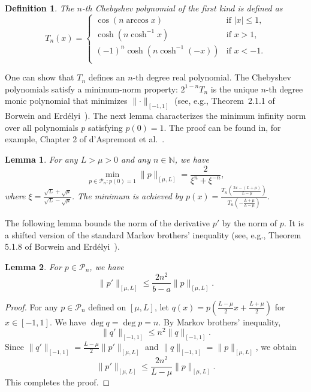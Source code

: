 \documentclass[11pt]{article}
\newcommand{\N}{\mathbb{N}}
\newcommand{\abs}[1]{\left\lvert#1\right\rvert}
\newcommand{\norm}[1]{\lVert#1\rVert}
\newtheorem{lemma}{Lemma}[section]
\newtheorem{definition}{Definition}[section]
\begin{document}
\begin{definition}\label{def:chebyshev_polynomial}
The $n$-th Chebyshev polynomial of the first kind is defined as
\[
	T_n(x) = \begin{cases}
		\cos(n\arccos x) &\text{if } \abs{x}\leq 1, \\
		\cosh(n\cosh^{-1}x) &\text{if }x>1, \\
		(-1)^n\cosh(n\cosh^{-1}(-x)) &\text{if }x<-1. \\
	\end{cases}
\]
\end{definition}
One can show that $T_n$ defines an $n$-th degree real polynomial.
The Chebyshev polynomials satisfy a minimum-norm property:
$2^{1-n}T_n$ is the unique $n$-th degree monic polynomial that minimizes $\norm{ \cdot }_{[-1,1]}$ (see, e.g., Theorem~2.1.1 of Borwein and Erd\'{e}lyi~\cite{borwein:1995}).
The next lemma characterizes the minimum infinity norm over all polynomials $p$ satisfying $p(0)=1$.
The proof can be found in, for example, Chapter 2 of d'Aspremont et al.~\cite{daspremont:2021}.

\begin{lemma}\label{lem:minimum_norm_polynomial}
For any $L>\mu>0$ and any $n\in\N$, we have
\[
	\min_{ p\in \mathscr{P}_n: p(0)=1 } \norm{p}_{ [\mu,L] }
    = \frac{2}{\xi^n + \xi^{-n}},
\]
where $\xi = \frac{\sqrt{L}+\sqrt{\mu}}{\sqrt{L} - \sqrt{\mu}}$.
The minimum is achieved by $p(x)=\frac{T_n(\frac{2x-(L+\mu)}{L-\mu})}{T_n(-\frac{L+\mu}{L-\mu})}$.
\end{lemma}


The following lemma bounds the norm of the derivative $p'$ by the norm of $p$.
It is a shifted version of the standard Markov brothers' inequality (see, e.g., Theorem 5.1.8 of Borwein and Erd\'{e}lyi~\cite{borwein:1995}).

\begin{lemma}\label{lem:markov_brother}
For $p\in\mathscr{P}_n$, we have
\[
    \norm{ p' }_{[\mu, L]} \leq \frac{2n^2}{b-a} \norm{ p }_{[\mu, L]}.
\]
\end{lemma}

\begin{proof}
For any $p\in\mathscr{P}_n$ defined on $[\mu, L]$, let $q(x) = p\left( \frac{L-\mu}{2}x + \frac{L+\mu}{2} \right)$ for $x\in[-1,1]$.
We have $\deg q = \deg p = n$.
By Markov brothers' inequality,
\[
	\norm{ q' }_{[-1,1]} \leq n^2 \norm{ q }_{[-1,1]}.
\]
Since $\norm{ q' }_{[-1,1]} = \frac{L-\mu}{2}\norm{p'}_{[\mu,L]}$ and $\norm{ q }_{[-1,1]} = \norm{ p }_{[\mu,L]}$, we obtain
\[
	\norm{ p' }_{[\mu,L]} \leq \frac{2n^2}{L-\mu} \norm{ p }_{[\mu,L]}.
\]
This completes the proof.
\end{proof}
\end{document}

